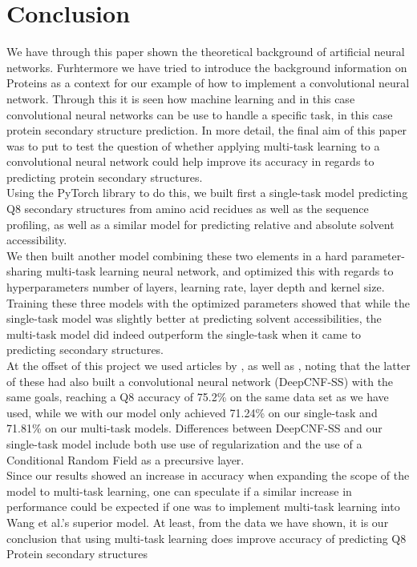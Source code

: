 \section{Conclusion}
We have through this paper shown the theoretical background of artificial neural networks. Furhtermore we have tried to introduce the background information on Proteins as a context for our example of how to implement a convolutional neural network. Through this it is seen how machine learning and in this case convolutional neural networks can be use to handle a specific task, in this case protein secondary structure prediction. In more detail, the final aim of this paper was to put to test the question of whether applying multi-task learning to a convolutional neural network could help improve its accuracy in regards to predicting protein secondary structures.\\
Using the PyTorch library to do this, we built first a single-task model predicting Q8 secondary structures from amino acid recidues as well as the sequence profiling, as well as a similar model for predicting relative and absolute solvent accessibility.\\
We then built another model combining these two elements in a hard parameter-sharing multi-task learning neural network, and optimized this with regards to hyperparameters number of layers, learning rate, layer depth and kernel size.\\
Training these three models with the optimized parameters showed that while the single-task model was slightly better at predicting solvent accessibilities, the multi-task model did indeed outperform the single-task when it came to predicting secondary structures.\\
At the offset of this project we used articles by \citeauthor{qi-et-al-2012}, \citeauthor{zhou-and-troyanskaya-2014} as well as \citeauthor{wang-et-al-2016}, noting that the latter of these had also built a convolutional neural network (DeepCNF-SS) with the same goals, reaching a Q8 accuracy of 75.2\% on the same data set as we have used, while we with our model only achieved 71.24\% on our single-task and 71.81\% on our multi-task models. Differences between DeepCNF-SS and our single-task model include both use use of regularization and the use of a Conditional Random Field as a precursive layer. \\
Since our results showed an increase in accuracy when expanding the scope of the model to multi-task learning, one can speculate if a similar increase in performance could be expected if one was to implement multi-task learning into Wang et al.'s superior model. At least, from the data we have shown, it is our conclusion that using multi-task learning does improve accuracy of predicting Q8 Protein secondary structures\\
